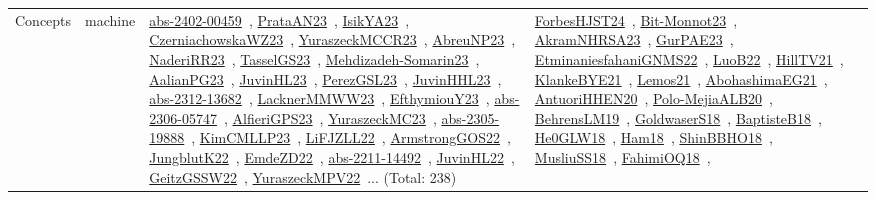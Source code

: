 {\begin{longtable}{lp{3cm}>{\raggedright\arraybackslash}p{6cm}>{\raggedright\arraybackslash}p{6cm}>{\raggedright\arraybackslash}p{8cm}}
Concepts & machine & \href{works/abs-2402-00459.pdf}{abs-2402-00459}~\cite{abs-2402-00459}, \href{works/PrataAN23.pdf}{PrataAN23}~\cite{PrataAN23}, \href{works/IsikYA23.pdf}{IsikYA23}~\cite{IsikYA23}, \href{works/CzerniachowskaWZ23.pdf}{CzerniachowskaWZ23}~\cite{CzerniachowskaWZ23}, \href{works/YuraszeckMCCR23.pdf}{YuraszeckMCCR23}~\cite{YuraszeckMCCR23}, \href{works/AbreuNP23.pdf}{AbreuNP23}~\cite{AbreuNP23}, \href{works/NaderiRR23.pdf}{NaderiRR23}~\cite{NaderiRR23}, \href{works/TasselGS23.pdf}{TasselGS23}~\cite{TasselGS23}, \href{works/Mehdizadeh-Somarin23.pdf}{Mehdizadeh-Somarin23}~\cite{Mehdizadeh-Somarin23}, \href{works/AalianPG23.pdf}{AalianPG23}~\cite{AalianPG23}, \href{works/JuvinHL23.pdf}{JuvinHL23}~\cite{JuvinHL23}, \href{works/PerezGSL23.pdf}{PerezGSL23}~\cite{PerezGSL23}, \href{works/JuvinHHL23.pdf}{JuvinHHL23}~\cite{JuvinHHL23}, \href{works/abs-2312-13682.pdf}{abs-2312-13682}~\cite{abs-2312-13682}, \href{works/LacknerMMWW23.pdf}{LacknerMMWW23}~\cite{LacknerMMWW23}, \href{works/EfthymiouY23.pdf}{EfthymiouY23}~\cite{EfthymiouY23}, \href{works/abs-2306-05747.pdf}{abs-2306-05747}~\cite{abs-2306-05747}, \href{works/AlfieriGPS23.pdf}{AlfieriGPS23}~\cite{AlfieriGPS23}, \href{works/YuraszeckMC23.pdf}{YuraszeckMC23}~\cite{YuraszeckMC23}, \href{works/abs-2305-19888.pdf}{abs-2305-19888}~\cite{abs-2305-19888}, \href{works/KimCMLLP23.pdf}{KimCMLLP23}~\cite{KimCMLLP23}, \href{works/LiFJZLL22.pdf}{LiFJZLL22}~\cite{LiFJZLL22}, \href{works/ArmstrongGOS22.pdf}{ArmstrongGOS22}~\cite{ArmstrongGOS22}, \href{works/JungblutK22.pdf}{JungblutK22}~\cite{JungblutK22}, \href{works/EmdeZD22.pdf}{EmdeZD22}~\cite{EmdeZD22}, \href{works/abs-2211-14492.pdf}{abs-2211-14492}~\cite{abs-2211-14492}, \href{works/JuvinHL22.pdf}{JuvinHL22}~\cite{JuvinHL22}, \href{works/GeitzGSSW22.pdf}{GeitzGSSW22}~\cite{GeitzGSSW22}, \href{works/YuraszeckMPV22.pdf}{YuraszeckMPV22}~\cite{YuraszeckMPV22}... (Total: 238) & \href{works/ForbesHJST24.pdf}{ForbesHJST24}~\cite{ForbesHJST24}, \href{works/Bit-Monnot23.pdf}{Bit-Monnot23}~\cite{Bit-Monnot23}, \href{works/AkramNHRSA23.pdf}{AkramNHRSA23}~\cite{AkramNHRSA23}, \href{works/GurPAE23.pdf}{GurPAE23}~\cite{GurPAE23}, \href{works/EtminaniesfahaniGNMS22.pdf}{EtminaniesfahaniGNMS22}~\cite{EtminaniesfahaniGNMS22}, \href{works/LuoB22.pdf}{LuoB22}~\cite{LuoB22}, \href{works/HillTV21.pdf}{HillTV21}~\cite{HillTV21}, \href{works/KlankeBYE21.pdf}{KlankeBYE21}~\cite{KlankeBYE21}, \href{works/Lemos21.pdf}{Lemos21}~\cite{Lemos21}, \href{works/AbohashimaEG21.pdf}{AbohashimaEG21}~\cite{AbohashimaEG21}, \href{works/AntuoriHHEN20.pdf}{AntuoriHHEN20}~\cite{AntuoriHHEN20}, \href{works/Polo-MejiaALB20.pdf}{Polo-MejiaALB20}~\cite{Polo-MejiaALB20}, \href{works/BehrensLM19.pdf}{BehrensLM19}~\cite{BehrensLM19}, \href{works/GoldwaserS18.pdf}{GoldwaserS18}~\cite{GoldwaserS18}, \href{works/BaptisteB18.pdf}{BaptisteB18}~\cite{BaptisteB18}, \href{works/He0GLW18.pdf}{He0GLW18}~\cite{He0GLW18}, \href{works/Ham18.pdf}{Ham18}~\cite{Ham18}, \href{works/ShinBBHO18.pdf}{ShinBBHO18}~\cite{ShinBBHO18}, \href{works/MusliuSS18.pdf}{MusliuSS18}~\cite{MusliuSS18}, \href{works/FahimiOQ18.pdf}{FahimiOQ18}~\cite{FahimiOQ18}, 
\end{longtable}}
